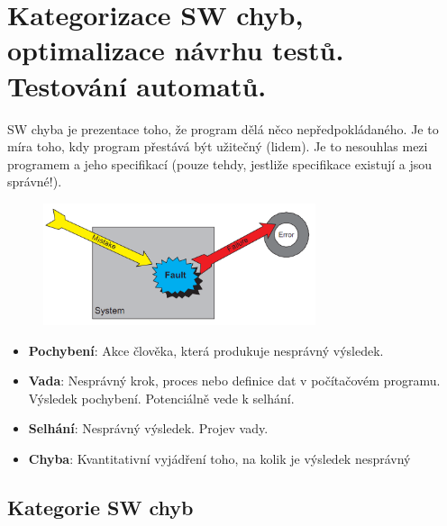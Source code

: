\section[TVS - Chyby,optimalizace testů,test. automatů]{Kategorizace SW chyb, optimalizace návrhu testů. Testování automatů.}

SW chyba je prezentace toho, že program dělá něco nepředpokládaného. Je to míra toho, kdy program přestává být užitečný (lidem). Je to nesouhlas mezi programem a jeho specifikací (pouze tehdy, jestliže specifikace existují a jsou správné!).

\begin{figure}[h!]
\centering
\includegraphics[width=80mm]{13/images/chyba}
\end{figure}

\begin{itemize}[itemsep=0px]
\item \textbf{Pochybení}: Akce člověka, která produkuje nesprávný výsledek.
\item \textbf{Vada}: Nesprávný krok, proces nebo definice dat v počítačovém programu. Výsledek pochybení. Potenciálně vede k selhání.
\item \textbf{Selhání}: Nesprávný výsledek. Projev vady.
\item \textbf{Chyba}: Kvantitativní vyjádření toho, na kolik je výsledek nesprávný
\end{itemize}

\subsection{Kategorie SW chyb}


